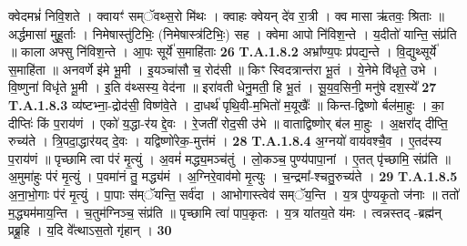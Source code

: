 \documentclass[17pt]{extarticle}
\begin{document}
                  क्वेदमभ्रं॑ निवि॒शते । क्वायꣳ॑ सम्ॅवथ्स॒रो मि॑थः । क्वाहः क्वेयन् दे॑व रा॒त्री । क्व मासा ऋ॑तवः॒ श्रिताः ॥ अर्द्धमासा॑ मुहू॒र्ताः । निमेषास्तु॑टिभिः॒ (निमेषास्त्र॑टिभिः॒) सह । क्वेमा आपो नि॑विश॒न्ते । य॒दीतो॑ यान्ति॒ संप्र॑ति ॥ काला अफ्सु नि॑विश॒न्ते । आ॒पः सूर्ये॑ स॒माहि॑ताः \textbf{ 26} \newline
                  \newline
                                                                  \textbf{ T.A.1.8.2} \newline
                  अभ्रा᳚ण्य॒पः प्र॑पद्य॒न्ते । वि॒द्युथ्सूर्ये॑ स॒माहि॑ता ॥ अनवर्णे इ॑मे भू॒मी । इ॒यञ्चा॑सौ च॒ रोद॑सी ॥ किꣳ स्विदत्रान्त॑रा भू॒तं । ये॒नेमे वि॑धृते॒ उभे ।  वि॒ष्णुना॑ विधृ॑ते भू॒मी । इ॒ति व॑थ्सस्य॒ वेद॑ना ॥  इरा॑वती धेनु॒मती॒ हि भू॒तं । सू॒य॒व॒सिनी॒ मनु॑षे दश॒स्ये᳚ \textbf{ 27} \newline
                  \newline
                                                                  \textbf{ T.A.1.8.3} \newline
                  व्य॑ष्टभ्ना॒-द्रोद॑सी॒ विष्ण॑वे॒ते । दा॒धर्थ॑ पृथि॒वी-म॒भितो॑ म॒यूखैः᳚ ॥  किन्त-द्विष्णो र्बल॑मा॒हुः । का॒ दीप्तिः॑ किं प॒राय॑णं ।  एको॑ य॒द्धा-र॑य द्दे॒वः । रे॒जती॑ रोद॒सी उ॑भे ॥ वाताद्विष्णोर् ब॑ल मा॒हुः । अ॒क्षरा᳚द् दीप्ति॒ रुच्य॑ते । त्रि॒पदा॒द्धार॑यद् दे॒वः । यद्विष्णो॑रेक॒-मुत्त॑मं । \textbf{ 28} \newline
                  \newline
                                                                  \textbf{ T.A.1.8.4} \newline
                  अ॒ग्नयो॑ वाय॑वश्चै॒व । ए॒तद॑स्य प॒राय॑णं ॥ पृच्छामि त्वा प॑रं मृ॒त्युं । अ॒वमं॑ मद्ध्य॒मञ्च॑तुं । लो॒कञ्च॒ पुण्य॑पापा॒नां ।  ए॒तत् पृ॑च्छामि॒ संप्र॑ति ॥ अ॒मुमा॑हुः प॑रं मृ॒त्युं । प॒वमा॑नं तु॒ मद्ध्य॑मं । अ॒ग्निरे॒वाव॑मो मृ॒त्युः । च॒न्द्रमा᳚-श्चतु॒रुच्य॑ते । \textbf{ 29} \newline
                  \newline
                                                                  \textbf{ T.A.1.8.5} \newline
                  अ॒ना॒भो॒गाः प॑रं मृ॒त्युं । पा॒पाः स॑म्ॅयन्ति॒ सर्व॑दा । आभोगास्त्वेव॑ सम्ॅय॒न्ति । य॒त्र पु॑ण्यकृ॒तो ज॑नाः ॥ ततो॑ म॒द्ध्यम॑माय॒न्ति । च॒तुम॑ग्निञ्च॒ संप्र॑ति ॥ पृच्छामि त्वा॑ पाप॒कृतः । य॒त्र या॑तय॒ते य॑मः । त्वन्नस्तद् -ब्रह्म॑न् प्रब्रू॒हि । य॒दि वे᳚त्थाऽस॒तो गृ॑हान् । \textbf{ 30} \newline
                  \newline
\end{document}
